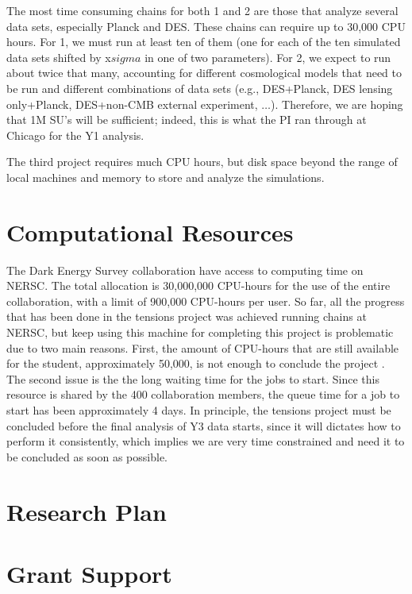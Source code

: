 \documentclass[12pt]{article}
\begin{document}
\begin{small}
The most time consuming chains for both 1 and 2 are those that analyze several data sets, especially Planck and DES. These chains can require up to 30,000 CPU hours. For 1, we must run at least ten of them (one for each of the ten simulated data sets shifted by x$sigma$ in one of two parameters). For 2, we expect to run about twice that many, accounting for different cosmological models that need to be run and different combinations of data sets (e.g., DES+Planck, DES lensing only+Planck, DES+non-CMB external experiment, $\ldots$). Therefore, we are hoping that 1M SU's will be sufficient; indeed, this is what the PI ran through at Chicago for the Y1 analysis.

The third project requires much CPU hours, but disk space beyond the range of local machines and memory to store and analyze the simulations.


\section{Computational Resources}

The Dark Energy Survey collaboration have access to computing time on NERSC. The total allocation is 30,000,000 CPU-hours for the use of the entire collaboration, with a  limit of 900,000 CPU-hours per user. So far, all the  progress that has been done in the tensions project was achieved running chains at NERSC, but keep using this machine for
completing this project is problematic due to two main reasons. First, the amount of CPU-hours that are still available for the student, approximately 50,000, is not enough to conclude the project . The second issue is the the long waiting time for the jobs to start. Since this resource is shared by the 400 collaboration members, the queue time for a job to start has been approximately 4 days. In principle, the tensions project must be concluded before the final analysis of Y3 data starts, since it will dictates how to perform it consistently, which implies we are very time constrained and need it to be concluded as soon as possible.



\section{Research Plan}

\section{Grant Support}


\end{small}
\end{document}
